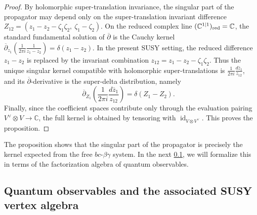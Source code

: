 \documentclass[final,reqno]{amsart}
\numberwithin{equation}{section}
\theoremstyle{definition}
\newtheorem{prp}[thm]{Proposition}
\newcommand{\ol}{\overline}
\newcommand{\ceq}{\coloneqq} %
\newcommand{\sing}{\textup{sing}}
\newcommand{\tred}{\textup{red}}
\newcommand{\bbC}{\mathbb{C}}
\newcommand{\sC}{\mathbb{C}^{1|1}}
\newcommand{\bpd}{\overline{\partial}}
\DeclareMathOperator{\id}{id}
\begin{document}

\begin{proof}
By holomorphic super-translation invariance, 
the singular part of the propagator may depend only on 
the super-translation invariant difference 
$Z_{12}=(z_1-z_2-\zeta_1\zeta_2,\ \zeta_1-\zeta_2)$. 
On the reduced complex line $(\sC)_{\tred}=\bbC$, 
the standard fundamental solution of $\bpd$ is the Cauchy kernel
$\bpd_{z_1}\left(\frac{1}{2\pi i}\frac{1}{z_1-z_2}\right)=\delta(z_1-z_2)$.
In the present SUSY setting, 
the reduced difference $z_1-z_2$ is replaced by the invariant combination
$z_{12}=z_1-z_2-\zeta_1\zeta_2$.
Thus the unique singular kernel 
compatible with holomorphic super-translations is
$\frac{1}{2\pi i} \frac{d\ol{z}_1}{z_{12}}$, 
and its $\bpd$-derivative is the super-delta distribution, namely
\[
 \bpd_{Z_1}\left(\frac{1}{2\pi i}\frac{d\ol{z}_1}{z_{12}}\right) =
 \delta(Z_1-Z_2).
\]
Finally, since the coefficient spaces contribute 
only through the evaluation pairing $V^\vee\otimes V\to \bbC$, 
the full kernel is obtained by tensoring with $\id_{V \otimes V^\vee}$. 
This proves the proposition.
\end{proof}

The proposition shows that the singular part of the propagator is 
precisely the kernel expected from the free $bc$-$\beta\gamma$ system. 
In the next \cref{ss:2.10},
we will formalize this in terms of 
the factorization algebra of quantum observables.


\subsection{Quantum observables and the associated SUSY vertex algebra}
\label{ss:2.10}
\end{document}
